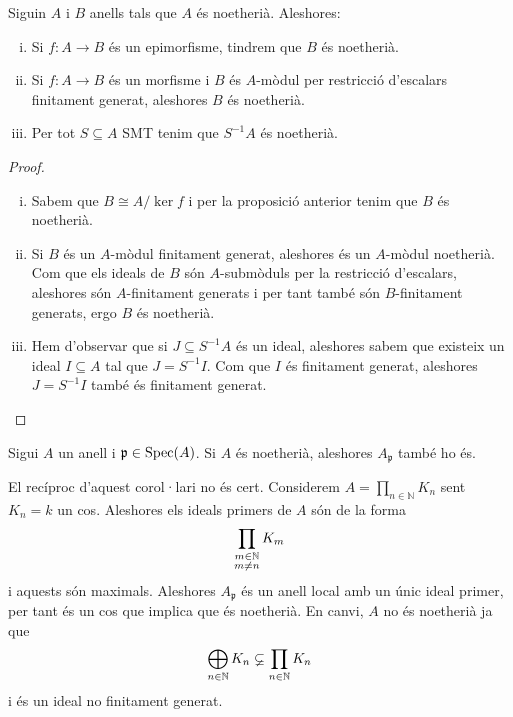 \documentclass[../../../main.tex]{subfiles}
\begin{document}
\begin{prop}
\label{prop:anellNoetheriaMorfismes} Siguin $A$ i $B$ anells tals que $A$ és noetherià. Aleshores:
\begin{enumerate}[(i)]
    \item Si $f:A\to B$ és un epimorfisme, tindrem que $B$ és noetherià. 
    \item Si $f:A\to B$ és un morfisme i $B$ és $A$-mòdul per restricció d'escalars finitament generat, aleshores $B$ és noetherià.
    \item Per tot $S\subseteq A$ SMT tenim que $S^{-1}A$ és noetherià.
\end{enumerate}
\end{prop}
\begin{proof}
\begin{enumerate}[(i)]
    \item Sabem que $B\cong A/\ker f$ i per la proposició anterior tenim que $B$ és noetherià.
    \item Si $B$ és un $A$-mòdul finitament generat, aleshores és un $A$-mòdul noetherià. Com que els ideals de $B$ són $A$-submòduls per la restricció d'escalars, aleshores són $A$-finitament generats i per tant també són $B$-finitament generats, ergo $B$ és noetherià.
    \item Hem d'observar que si $J\subseteq S^{-1}A$ és un ideal, aleshores sabem que existeix un ideal $I\subseteq A$ tal que $J = S^{-1}I$. Com que $I$ és finitament generat, aleshores $J = S^{-1}I$ també és finitament generat.
\end{enumerate}
\end{proof}


\begin{coro}
Sigui $A$ un anell i $\mathfrak{p}\in\mathrm{Spec}(A)$. Si $A$ és noetherià, aleshores $A_\mathfrak{p}$ també ho és.
\end{coro}

\begin{nota}
El recíproc d'aquest corol·lari no és cert. Considerem $A = \prod_{n\in \mathbb{N}}K_n$ sent $K_n = k$ un cos. Aleshores els ideals primers de $A$ són de la forma
\begin{equation}
    \notag
    \prod_{\substack{m\in\mathbb{N}\\m\neq n}}K_m
\end{equation}
i aquests són maximals. Aleshores $A_\mathfrak{p}$ és un anell local amb un únic ideal primer, per tant és un cos que implica que és noetherià. En canvi, $A$ no és noetherià ja que 
\begin{equation}
    \notag
    \bigoplus_{n\in\mathbb{N}}K_n\varsubsetneq \prod_{n\in\mathbb{N}}K_n
\end{equation}
i és un ideal no finitament generat.
\end{nota}
\end{document}
